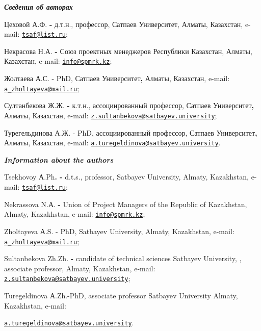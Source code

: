 \begin{authorinfo}
\hspace{1em}\emph{{\bfseries Сведения об авторах}}

Цеховой А.Ф. {\bfseries -} д.т.н., профессор, Сатпаев Университет, Алматы,
Казахстан, e-mail: \href{mailto:tsaf@list.ru}{\nolinkurl{tsaf@list.ru}};

Некрасова Н.А. {\bfseries -} Союз проектных менеджеров Республики
Казахстан, Алматы, Казахстан, e-mail:
\href{mailto:info@spmrk.kz}{\nolinkurl{info@spmrk.kz}};

Жолтаева А.С. - PhD, Сатпаев Университет{\bfseries ,} Алматы, Казахстан,
e-mail:
\href{mailto:a_zholtayeva@mail.ru}{\nolinkurl{a\_zholtayeva@mail.ru}};

Султанбекова Ж.Ж. {\bfseries -} к.т.н., ассоциированный профессор, Сатпаев
Университет{\bfseries ,} Алматы, Казахстан, e-mail:
\href{mailto:z.sultanbekova@satbayev.university}{\nolinkurl{z.sultanbekova@satbayev.university}};

Турегельдинова А.Ж. - PhD, ассоциированный профессор, Сатпаев
Университет{\bfseries ,} Алматы, Казахстан, e-mail:
\href{mailto:a.turegeldinova@satbayev.university}{\nolinkurl{a.turegeldinova@satbayev.university}}.

\hspace{1em}\emph{{\bfseries Information about the authors}}

Tsekhovoy А.Ph{\bfseries . -} d.t.s., professor, Satbayev University,
Almaty, Kazakhstan, e-mail:
\href{mailto:tsaf@list.ru}{\nolinkurl{tsaf@list.ru}};

Nekrassova N.А. {\bfseries -} Union of Project Managers of the Republic of
Kazakhstan, Almaty, Kazakhstan, e-mail:
\href{mailto:info@spmrk.kz}{\nolinkurl{info@spmrk.kz}};

Zholtayeva А.S. - PhD, Satbayev University, Almaty, Kazakhstan, e-mail:
\href{mailto:a_zholtayeva@mail.ru}{\nolinkurl{a\_zholtayeva@mail.ru}};

Sultanbekova Zh.Zh. {\bfseries -} candidate of technical sciences Satbayev
University, , associate professor, Almaty, Kazakhstan, e-mail:
\href{mailto:z.sultanbekova@satbayev.university}{\nolinkurl{z.sultanbekova@satbayev.university}};

Turegeldinova А.Zh.-PhD, associate professor Satbayev University Almaty,
Kazakhstan, e-mail:

\href{mailto:a.turegeldinova@satbayev.university}{\nolinkurl{a.turegeldinova@satbayev.university}}.
\end{authorinfo}

